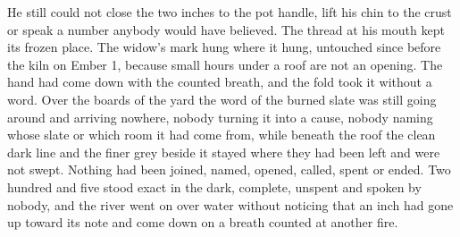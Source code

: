 He still could not close the two inches to the pot handle, lift his chin to the crust or speak a number anybody would have believed. The thread at his mouth kept its frozen place. The widow's mark hung where it hung, untouched since before the kiln on Ember 1, because small hours under a roof are not an opening. The hand had come down with the counted breath, and the fold took it without a word. Over the boards of the yard the word of the burned slate was still going around and arriving nowhere, nobody turning it into a cause, nobody naming whose slate or which room it had come from, while beneath the roof the clean dark line and the finer grey beside it stayed where they had been left and were not swept. Nothing had been joined, named, opened, called, spent or ended. Two hundred and five stood exact in the dark, complete, unspent and spoken by nobody, and the river went on over water without noticing that an inch had gone up toward its note and come down on a breath counted at another fire.
